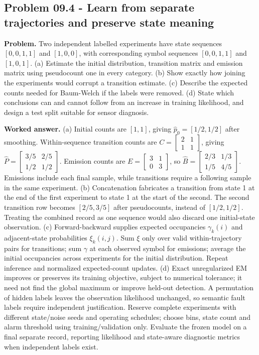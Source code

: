 \documentclass[11pt,a4paper]{article}
\begin{document}
\subsection{Problem 09.4 - Learn from separate trajectories and preserve state meaning}
\textbf{Problem.} Two independent labelled experiments have state sequences $[0,0,1,1]$ and $[1,0,0]$, with corresponding symbol sequences $[0,0,1,1]$ and $[1,0,1]$. (a) Estimate the initial distribution, transition matrix and emission matrix using pseudocount one in every category. (b) Show exactly how joining the experiments would corrupt a transition estimate. (c) Describe the expected counts needed for Baum-Welch if the labels were removed. (d) State which conclusions can and cannot follow from an increase in training likelihood, and design a test split suitable for sensor diagnosis.


\textbf{Worked answer.} (a) Initial counts are $[1,1]$, giving $\hat p_0=[1/2,1/2]$ after smoothing. Within-sequence transition counts are $C=\left[\begin{smallmatrix}2&1\\1&1\end{smallmatrix}\right]$, giving $\hat P=\left[\begin{smallmatrix}3/5&2/5\\1/2&1/2\end{smallmatrix}\right]$. Emission counts are $E=\left[\begin{smallmatrix}3&1\\0&3\end{smallmatrix}\right]$, so $\hat B=\left[\begin{smallmatrix}2/3&1/3\\1/5&4/5\end{smallmatrix}\right]$. Emissions include each final sample, while transitions require a following sample in the same experiment. (b) Concatenation fabricates a transition from state 1 at the end of the first experiment to state 1 at the start of the second. The second transition row becomes $[2/5,3/5]$ after pseudocounts, instead of $[1/2,1/2]$. Treating the combined record as one sequence would also discard one initial-state observation. (c) Forward-backward supplies expected occupancies $\gamma_k(i)$ and adjacent-state probabilities $\xi_k(i,j)$. Sum $\xi$ only over valid within-trajectory pairs for transitions; sum $\gamma$ at each observed symbol for emissions; average the initial occupancies across experiments for the initial distribution. Repeat inference and normalized expected-count updates. (d) Exact unregularized EM improves or preserves its training objective, subject to numerical tolerance; it need not find the global maximum or improve held-out detection. A permutation of hidden labels leaves the observation likelihood unchanged, so semantic fault labels require independent justification. Reserve complete experiments with different state/noise seeds and operating schedules; choose bins, state count and alarm threshold using training/validation only. Evaluate the frozen model on a final separate record, reporting likelihood and state-aware diagnostic metrics when independent labels exist.
\end{document}
